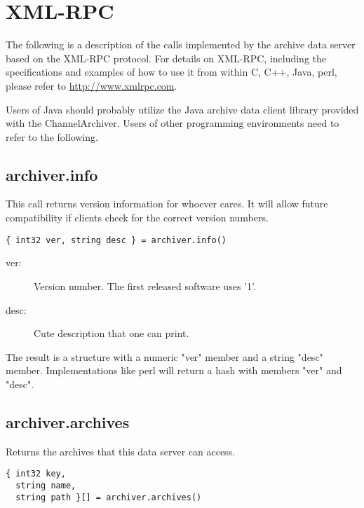 \section{XML-RPC} \label{sec:xmlprotocol}
The following is a description of the calls implemented by the archive
data server based on the XML-RPC protocol.
For details on XML-RPC, including the specifications and examples of
how to use it from within C, C++, Java, perl, please refer to
\href{http://www.xmlrpc.com}{http://www.xmlrpc.com}.

Users of Java should probably utilize the Java archive data client
library provided with the ChannelArchiver. Users of other programming
environments need to refer to the following.

\subsection{archiver.info} %
This call returns version information for 
whoever cares. It will allow future compatibility
if clients check for the correct version numbers.

\begin{lstlisting}[keywordstyle=\sffamily]
{ int32 ver, string desc } = archiver.info()
\end{lstlisting}

\begin{description}
\item[\sffamily ver:]  Version number. The first released software uses '1'.
\item[\sffamily desc:] Cute description that one can print.
\end{description}

\noindent The result is a structure with a numeric "ver"
member and a string "desc" member. Implementations
like perl will return a hash with members "ver"
and "desc".

\subsection{archiver.archives} %
Returns the archives that this data server can access.

\begin{lstlisting}[keywordstyle=\sffamily]
{ int32 key,
  string name,
  string path }[] = archiver.archives()
\end{lstlisting}

